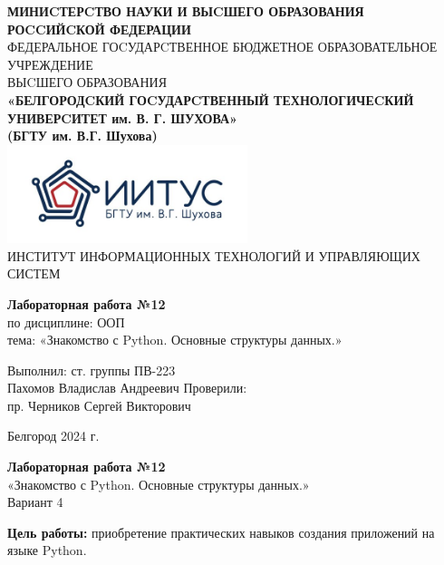 \documentclass[a4paper,14pt]{extarticle}
\newcommand\textbox[1]{
	\parbox{.45\textwidth}{#1}
}
\begin{document}
\begin{center}
    \small{
        \textbf{МИНИCТЕРCТВО НАУКИ И ВЫCШЕГО ОБРАЗОВАНИЯ РОCCИЙCКОЙ ФЕДЕРАЦИИ}\\
        ФЕДЕРАЛЬНОЕ ГОCУДАРCТВЕННОЕ БЮДЖЕТНОЕ ОБРАЗОВАТЕЛЬНОЕ УЧРЕЖДЕНИЕ\\ВЫCШЕГО ОБРАЗОВАНИЯ \\
        \textbf{«БЕЛГОРОДCКИЙ ГОCУДАРCТВЕННЫЙ ТЕХНОЛОГИЧЕCКИЙ\\УНИВЕРCИТЕТ им. В. Г. ШУХОВА»\\ (БГТУ им. В.Г. Шухова)} \\
        \bigbreak
        \includegraphics[width=70mm]{log}\\
        ИНСТИТУТ ИНФОРМАЦИОННЫХ ТЕХНОЛОГИЙ И УПРАВЛЯЮЩИХ СИСТЕМ\\}
\end{center}

\vfill
\begin{center}
    \large{
        \textbf{
            Лабораторная работа №12}}\\
    \normalsize{
        по дисциплине: ООП \\
        тема: «Знакомство с Python. Основные структуры данных.»}
\end{center}
\vfill
\hfill\textbox{
    Выполнил: ст. группы ПВ-223\\Пахомов Владислав Андреевич
    \bigbreak
    Проверили: \\пр. Черников Сергей Викторович
}
\vfill\begin{center}
    Белгород 2024 г.
\end{center}
\newpage
\begin{center}
    \textbf{Лабораторная работа №12}\\
    «Знакомство с Python. Основные структуры данных.»\\
    Вариант 4
\end{center}
\textbf{Цель работы: }приобретение практических навыков создания приложений на
языке Python.\\
\end{document}
